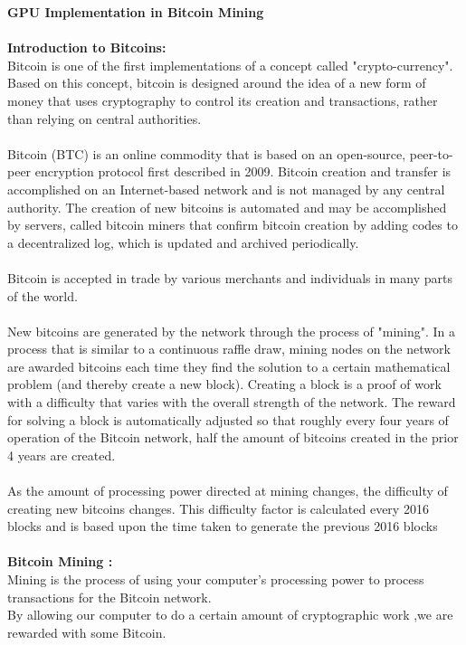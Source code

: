 \documentclass[a4paper,11pt]{article}
\begin{document}
\textbf{\LARGE GPU Implementation in Bitcoin Mining}\\\\
\textbf{Introduction to Bitcoins:}\\
Bitcoin is one of the first implementations of a concept called "crypto-currency". Based on this concept, bitcoin is designed around the idea of a new form of money that uses cryptography to control its creation and transactions, rather than relying on central authorities.\\\\
Bitcoin (BTC) is an online commodity that is based on an open-source, peer-to-peer encryption protocol first described in 2009. Bitcoin creation and transfer is accomplished on an Internet-based network and is not managed by any central authority. The creation of new bitcoins is automated and may be accomplished by servers, called bitcoin miners that confirm bitcoin creation by adding codes to a decentralized log, which is updated and archived periodically.\\\\
Bitcoin is accepted in trade by various merchants and individuals in many parts of the world.\\\\
New bitcoins are generated by the network through the process of "mining". In a process that is similar to a continuous raffle draw, mining nodes on the network are awarded bitcoins each time they find the solution to a certain mathematical problem (and thereby create a new block). Creating a block is a proof of work with a difficulty that varies with the overall strength of the network. The reward for solving a block is automatically adjusted so that roughly every four years of operation of the Bitcoin network, half the amount of bitcoins created in the prior 4 years are created.\\\\ 
As the amount of processing power directed at mining changes, the difficulty of creating new bitcoins changes. This difficulty factor is calculated every 2016 blocks and is based upon the time taken to generate the previous 2016 blocks\\\\
\textbf{Bitcoin Mining :}\\
Mining is the process of using your computer's processing power to process  transactions for the Bitcoin network.\\ 
By allowing our computer to do a certain amount of cryptographic work ,we are rewarded with some Bitcoin.\\
\end{document}
